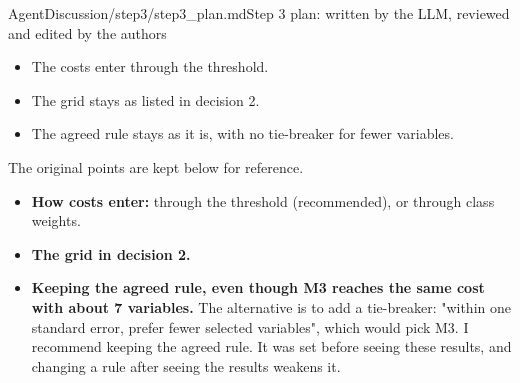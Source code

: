 \begin{mdfile}{AgentDiscussion/\allowbreak{}step3/\allowbreak{}step3\_plan.md}{Step 3 plan: written by the LLM, reviewed and edited by the authors}
\begin{itemize}
\tightlist
\item
  The costs enter through the threshold.
\item
  The grid stays as listed in decision 2.
\item
  The agreed rule stays as it is, with no tie-breaker for fewer variables.
\end{itemize}

The original points are kept below for reference.

\begin{itemize}
\tightlist
\item
  \textbf{How costs enter:} through the threshold (recommended), or through class weights.
\item
  \textbf{The grid in decision 2.}
\item
  \textbf{Keeping the agreed rule, even though M3 reaches the same cost with about 7 variables.} The alternative is to add a tie-breaker: "within one standard error, prefer fewer selected variables", which would pick M3. I recommend keeping the agreed rule. It was set before seeing these results, and changing a rule after seeing the results weakens it.
\end{itemize}
\end{mdfile}

